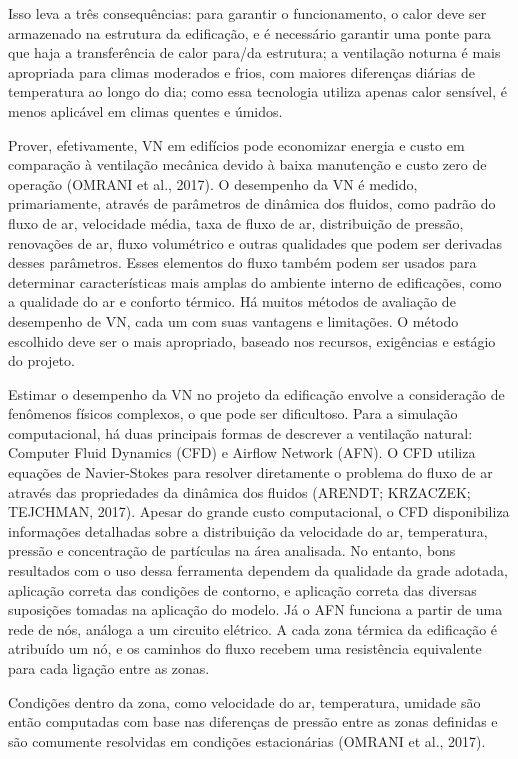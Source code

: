 \documentclass[brazil,hardcopy,openany,a5paper]{ufscthesis}
\begin{document}
	Isso leva a três consequências: para garantir o funcionamento, o calor deve ser armazenado na estrutura da edificação, e é necessário garantir uma ponte para que haja a transferência de calor para/da estrutura; a ventilação noturna é mais apropriada para climas moderados e frios, com maiores diferenças diárias de temperatura ao longo do dia; como essa tecnologia utiliza apenas calor sensível, é menos aplicável em climas quentes e úmidos.
	
	Prover, efetivamente, VN em edifícios pode economizar energia e custo em comparação à ventilação mecânica devido à baixa manutenção e custo zero de operação (OMRANI et al., 2017). O desempenho da VN é medido, primariamente, através de parâmetros de dinâmica dos fluidos, como padrão do fluxo de ar, velocidade média, taxa de fluxo de ar, distribuição de pressão, renovações de ar, fluxo volumétrico e outras qualidades que podem ser derivadas desses parâmetros. Esses elementos do fluxo também podem ser usados para determinar características mais amplas do ambiente interno de edificações, como a qualidade do ar e conforto térmico. Há muitos métodos de
	avaliação de desempenho de VN, cada um com suas vantagens e limitações. O método escolhido deve ser o mais apropriado, baseado nos recursos, exigências e estágio do projeto.
	
	Estimar o desempenho da VN no projeto da edificação envolve a consideração de fenômenos físicos complexos, o que pode ser dificultoso. Para a simulação computacional, há duas principais formas de descrever a ventilação natural: Computer Fluid Dynamics (CFD) e Airflow Network (AFN). O CFD utiliza equações de Navier-Stokes para resolver diretamente o problema do fluxo de ar através das propriedades da dinâmica dos fluidos (ARENDT; KRZACZEK; TEJCHMAN, 2017). Apesar do grande custo computacional, o CFD disponibiliza informações detalhadas sobre a distribuição da velocidade do ar, temperatura, pressão e concentração de partículas na área analisada. No entanto, bons
	resultados com o uso dessa ferramenta dependem da qualidade da grade adotada, aplicação correta das condições de contorno, e aplicação correta das diversas suposições tomadas na aplicação do modelo. Já o AFN funciona a partir de uma rede de nós, análoga a um circuito
	elétrico. A cada zona térmica da edificação é atribuído um nó, e os caminhos do fluxo recebem uma resistência equivalente para cada ligação entre as zonas.
	
	Condições dentro da zona, como velocidade do ar, temperatura, umidade são então computadas com base nas diferenças de pressão entre as zonas definidas e são comumente resolvidas em condições estacionárias (OMRANI et al., 2017).
	
\end{document}
